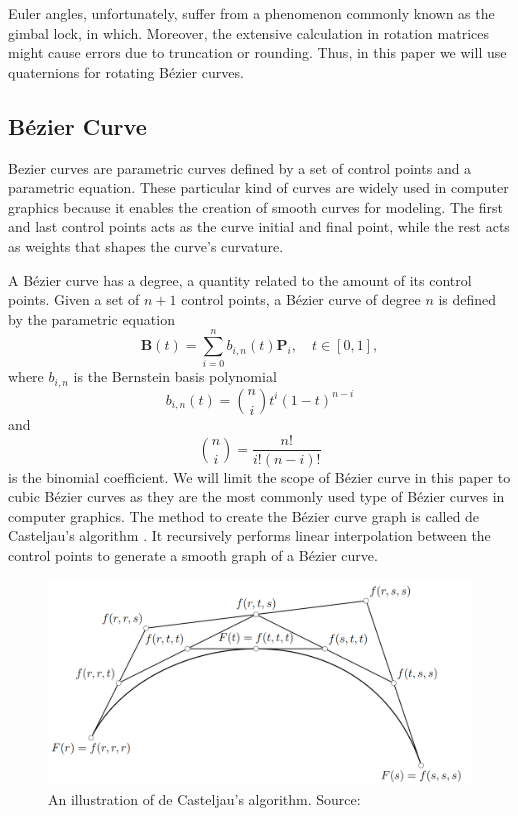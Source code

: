\documentclass[conference]{IEEEtran}
\begin{document}
Euler angles, unfortunately, suffer from a phenomenon commonly known as the gimbal lock, in which. Moreover, the extensive calculation in rotation matrices might cause errors due to truncation or rounding. Thus, in this paper we will use quaternions for rotating Bézier curves.

\subsection{Bézier Curve} 
Bezier curves are parametric curves defined by a set of control points and a parametric equation. These particular kind of curves are widely used in computer graphics because it enables the creation of smooth curves for modeling. The first and last control points acts as the curve initial and final point, while the rest acts as weights that shapes the curve's curvature.

A Bézier curve has a degree, a quantity related to the amount of its control points. Given a set of $n+1$ control points, a Bézier curve of degree $n$ is defined by the parametric equation
\begin{equation}
    \mathbf{B}(t) = \sum_{i=0}^n b_{i,n}(t) \mathbf{P}_i, \quad t \in [0, 1],
\end{equation}
where $b_{i, n}$ is the Bernstein basis polynomial\cite{galier}
\begin{equation}
    b_{i,n}(t) = \binom{n}{i} t^i (1-t)^{n-i}
\end{equation}
and 
\begin{equation}
    \binom{n}{i} = \frac{n!}{i!(n-i)!}
\end{equation}
is the binomial coefficient. We will limit the scope of Bézier curve in this paper to cubic Bézier curves as they are the most commonly used type of Bézier curves in computer graphics. The method to create the Bézier curve graph is called de Casteljau's algorithm \cite{galier}. It recursively performs linear interpolation between the control points to generate a smooth graph of a Bézier curve.

\begin{figure}[htb!]
    \centering
    \includegraphics[width=0.75\linewidth]{casteljau.png}
    \caption{An illustration of de Casteljau's algorithm. Source: \cite{galier}}
\end{figure}
\end{document}
